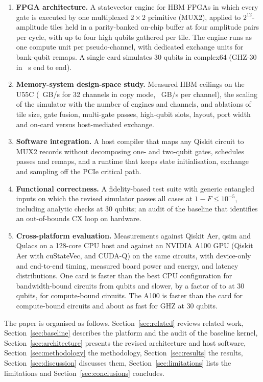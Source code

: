 \begin{enumerate}
\item \textbf{FPGA architecture.} A statevector engine for HBM FPGAs in which every gate is executed by one multiplexed $2\times2$ primitive (MUX2), applied to $2^{12}$-amplitude tiles held in a parity-banked on-chip buffer at four amplitude pairs per cycle, with up to four high qubits gathered per tile. The engine runs as one compute unit per pseudo-channel, with dedicated exchange units for bank-qubit remaps. A single card simulates 30 qubits in complex64 (GHZ-30 in \NumFlagGhzThirtyEtoE~s end to end).
\item \textbf{Memory-system design-space study.} Measured HBM ceilings on the U55C (\NumHbmThirtytwoCopy~GB/s for 32 channels in copy mode, \NumHbmSixteenPerCURead~GB/s per channel), the scaling of the simulator with the number of engines and channels, and ablations of tile size, gate fusion, multi-gate passes, high-qubit slots, layout, port width and on-card versus host-mediated exchange.
\item \textbf{Software integration.} A host compiler that maps any Qiskit circuit to MUX2 records without decomposing one- and two-qubit gates, schedules passes and remaps, and a runtime that keeps state initialisation, exchange and sampling off the PCIe critical path.
\item \textbf{Functional correctness.} A fidelity-based test suite with generic entangled inputs on which the revised simulator passes all \NumSuiteTotal{} cases at $1-F\leq 10^{-5}$, including analytic checks at 30 qubits; an audit of the baseline that identifies an out-of-bounds CX loop on hardware.
\item \textbf{Cross-platform evaluation.} Measurements against Qiskit Aer, qsim and Qulacs on a 128-core CPU host and against an NVIDIA A100 GPU (Qiskit Aer with cuStateVec, and CUDA-Q) on the same circuits, with device-only and end-to-end timing, measured board power and energy, and latency distributions. One card is faster than the best CPU configuration for bandwidth-bound circuits from \NumXplatGhzCrossN{} qubits and slower, by a factor of \NumXplatCpuFasterOtherThirtyMin to \NumXplatCpuFasterOtherThirtyMax{} at 30 qubits, for compute-bound circuits. The A100 is faster than the card for compute-bound circuits and about as fast for GHZ at 30 qubits.
\end{enumerate}

The paper is organised as follows. Section~\ref{sec:related} reviews related work, Section~\ref{sec:baseline} describes the platform and the audit of the baseline kernel, Section~\ref{sec:architecture} presents the revised architecture and host software, Section~\ref{sec:methodology} the methodology, Section~\ref{sec:results} the results, Section~\ref{sec:discussion} discusses them, Section~\ref{sec:limitations} lists the limitations and Section~\ref{sec:conclusions} concludes.
